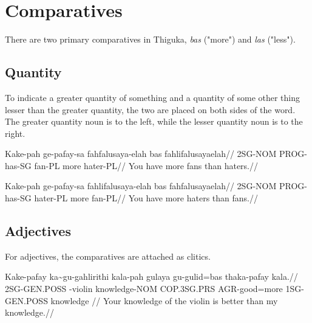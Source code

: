 \section{Comparatives}
There are two primary comparatives in Thiguka, \textit{bas} ("more") and \textit{las} ("less").

\subsection{Quantity}
To indicate a greater quantity of something and a quantity of some other thing lesser than the greater quantity, the two are placed on both sides of the word.
The greater quantity noun is to the left, while the lesser quantity noun is to the right.

\ex
\begingl
\gla Kake-pah ge-pafay-sa fahfalusaya-elah bas  fahlifalusayaelah//  
\glb 2SG-NOM  PROG-has-SG fan-PL           more hater-PL//  
\glft You have more fans than haters.//  
\endgl
\xe

\ex
\begingl
\gla Kake-pah ge-pafay-sa fahlifalusaya-elah bas  fahfalusayaelah//  
\glb 2SG-NOM  PROG-has-SG hater-PL           more fan-PL//  
\glft You have more haters than fans.//  
\endgl
\xe

\subsection{Adjectives}
For adjectives, the comparatives are attached as clitics.

\ex
\begingl
\gla Kake-pafay ka\~{}gu-gahlirithi kala-pah      gulaya      gu-gulid=bas  thaka-pafay kala.//  
\glb 2SG-GEN.POSS \agradj{}-violin  knowledge-NOM COP.3SG.PRS AGR-good=more 1SG-GEN.POSS knowledge //  
\glft Your knowledge of the violin is better than my knowledge.//  
\endgl
\xe

